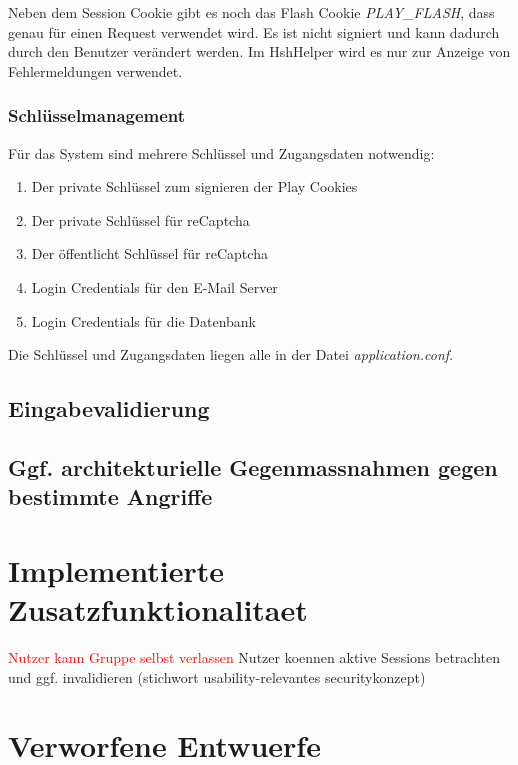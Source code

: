 \documentclass[12pt,DIV14,BCOR10mm,a4paper,twoside,parskip=half-,headsepline,headinclude,english,ngerman,bibliography=totocnumbered]{scrreprt}
\begin{document}
Neben dem Session Cookie gibt es noch das Flash Cookie \textit{PLAY\_FLASH}, dass genau für einen Request verwendet wird. Es ist nicht signiert und kann dadurch durch den Benutzer verändert werden. Im HshHelper wird es nur zur Anzeige von Fehlermeldungen verwendet.

\subsection{Schlüsselmanagement}
Für das System sind mehrere Schlüssel und Zugangsdaten notwendig:

\begin{enumerate}
	\item Der private Schlüssel zum signieren der Play Cookies
	\item Der private Schlüssel für reCaptcha
	\item Der öffentlicht Schlüssel für reCaptcha
	\item Login Credentials für den E-Mail Server
	\item Login Credentials für die Datenbank
\end{enumerate}

Die Schlüssel und Zugangsdaten liegen alle in der Datei \textit{application.conf}.

\section{Eingabevalidierung}

\section{Ggf. architekturielle Gegenmassnahmen gegen bestimmte Angriffe}

\chapter{Implementierte Zusatzfunktionalitaet}

\textcolor{red}{Nutzer kann Gruppe selbst verlassen}
Nutzer koennen aktive Sessions betrachten und ggf. invalidieren (stichwort usability-relevantes securitykonzept)

\chapter{Verworfene Entwuerfe}
\end{document}
